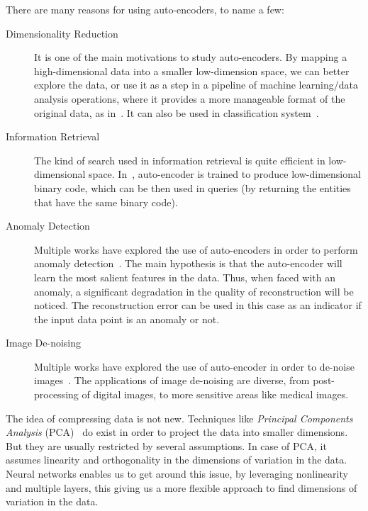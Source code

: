   \par There are many reasons for using auto-encoders, to name a few:
  \begin{description}
    \item [Dimensionality Reduction] It is one of the main motivations to study auto-encoders. By mapping a high-dimensional data into a smaller low-dimension space, we can better explore the data, or use it as a step in a pipeline of machine learning/data analysis operations, where it provides a more manageable format of the original data, as in~\citep{ha2018world}. It can also be used in classification system~\citep{Goodfellow-et-al-2016}.

    \item [Information Retrieval] The kind of search used in information retrieval is quite efficient in low-dimensional space. In~\citep{salakhutdinov2009semantic}, auto-encoder is trained to produce low-dimensional binary code, which can be then used in queries (by returning the entities that have the same binary code).

    \item [Anomaly Detection] Multiple works have explored the use of auto-encoders in order to perform anomaly detection~\citep{sakurada2014anomaly,an2015variational,ribeiro2018study}. The main hypothesis is that the auto-encoder will learn the most salient features in the data. Thus, when faced with an anomaly, a significant degradation in the quality of reconstruction will be noticed. The reconstruction error can be used in this case as an indicator if the input data point is an anomaly or not.

    \item [Image De-noising] Multiple works have explored the use of auto-encoder in order to de-noise images~\citep{cho2013boltzmann,cho2013simple,gondara2016medical}. The applications of image de-noising are diverse, from post-processing of digital images, to more sensitive areas like medical images.

  \end{description}

  \par The idea of compressing data is not new. Techniques like \textit{Principal Components Analysis} (PCA)~\citep{jolliffe2011principal} do exist in order to project the data into smaller dimensions. But they are usually restricted by several assumptions. In case of PCA, it assumes linearity and orthogonality in the dimensions of variation in the data. Neural networks enables us to get around this issue, by leveraging nonlinearity and multiple layers, this giving us a more flexible approach to find dimensions of variation in the data.

